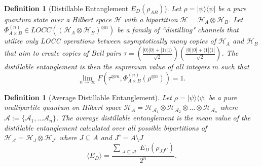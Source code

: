 \documentclass{article}
\newtheorem{definition}[theorem]{Definition}
\newcommand{\ket}[1]{|#1\rangle}
\newcommand{\bra}[1]{\langle #1|}
\newcommand{\ketbra}[2]{| #1\rangle\! \langle #2|}
\begin{document}
\begin{definition} [Distillable Entanglement $E_D(\rho_{AB})$]
Let $\rho = \ketbra{\psi}{\psi}$ be a pure quantum state over a Hilbert space $\mathcal{H}$ with a bipartition $\mathcal{H} = \mathcal{H}_A \otimes \mathcal{H}_B$. Let $\Phi_{A \times B}^{(n)} \in LOCC((\mathcal{H}_A \otimes \mathcal{H}_B)^{\otimes n})$ be a family of ``distilling" channels that utilize only LOCC operations between asymptotically many copies of $\mathcal{H}_A$ and $\mathcal{H}_B$ that aim to create copies of Bell pairs $\tau = \left(\frac{\ket{0}\ket{0} + \ket{1}\ket{1}}{\sqrt{2}} \right) \left(\frac{\bra{0}\bra{0} + \bra{1}\bra{1}}{\sqrt{2}} \right)$. The \emph{distillable entanglement} is then the supremum value of all integers $m$ such that 
$$
\lim_{n \to \infty} F\left( \tau^{\otimes m}, \Phi_{A \times B}^{(n)} (\rho^{\otimes n}) \right) = 1.
$$

\end{definition}
\begin{definition} [Average Distillable Entanglement]
    Let $\rho = \ketbra{\psi}{\psi}$ be a pure multipartite quantum on Hilbert space $\mathcal{H}_A = \mathcal{H}_{\mathcal{A}_1} \otimes \mathcal{H}_{\mathcal{A}_2} \otimes \dots \otimes \mathcal{H}_{\mathcal{A}_n}$  where $\mathcal{A} := \{\mathcal{A}_1, \ldots \mathcal{A}_n\}$. The average distillable entanglement is the mean value of the distillable entanglement calculated over all possible bipartitions of $\mathcal{H_A} = \mathcal{H}_J \otimes \mathcal{H}_{J^c}$ where $J \subseteq A$ and $J^c = A \setminus J$
    \begin{equation}
     \langle E_D \rangle = \frac{\sum_{\substack{J \subseteq \mathcal{A}} }E_D(\rho_{J J^{C}})}{2^n}.
    \end{equation}
    
\end{definition}
\end{document}
